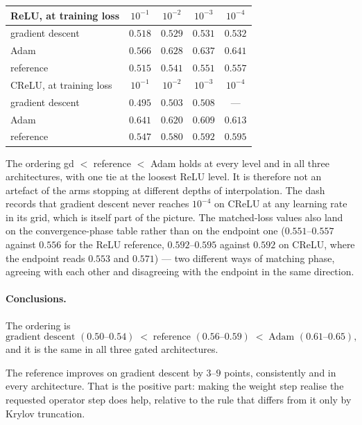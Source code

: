 \documentclass{article} %
\theoremstyle{plain}
\theoremstyle{definition}
\theoremstyle{remark}
\begin{document}
\begin{center}\small
\begin{tabular}{lcccc}
\toprule
ReLU, at training loss & $10^{-1}$ & $10^{-2}$ & $10^{-3}$ & $10^{-4}$ \\
\midrule
gradient descent & $0.518$ & $0.529$ & $0.531$ & $0.532$ \\
Adam             & $0.566$ & $0.628$ & $0.637$ & $\mathbf{0.641}$ \\
reference        & $0.515$ & $0.541$ & $0.551$ & $0.557$ \\
\midrule
CReLU, at training loss & $10^{-1}$ & $10^{-2}$ & $10^{-3}$ & $10^{-4}$ \\
\midrule
gradient descent & $0.495$ & $0.503$ & $0.508$ & --- \\
Adam             & $0.641$ & $0.620$ & $0.609$ & $\mathbf{0.613}$ \\
reference        & $0.547$ & $0.580$ & $0.592$ & $0.595$ \\
\bottomrule
\end{tabular}
\end{center}

\noindent The ordering gd $<$ reference $<$ Adam holds at every level and in all three
architectures, with one tie at the loosest ReLU level. It is therefore not an artefact of the arms
stopping at different depths of interpolation. The dash records that gradient descent never reaches
$10^{-4}$ on CReLU at any learning rate in its grid, which is itself part of the picture. The
matched-loss values also land on the convergence-phase table rather than on the endpoint one
($0.551$--$0.557$ against $0.556$ for the ReLU reference, $0.592$--$0.595$ against $0.592$ on
CReLU, where the endpoint reads $0.553$ and $0.571$) --- two different ways of matching phase,
agreeing with each other and disagreeing with the endpoint in the same direction.

\paragraph{Conclusions.}
The ordering is
\[
  \text{gradient descent } (0.50\text{--}0.54) \;<\;
  \text{reference } (0.56\text{--}0.59) \;<\;
  \text{Adam } (0.61\text{--}0.65),
\]
and it is the same in all three gated architectures.

The reference improves on gradient descent by $3$--$9$ points, consistently and in every
architecture. That is the positive part: making the weight step realise the requested operator step
does help, relative to the rule that differs from it only by Krylov truncation.
\end{document}
